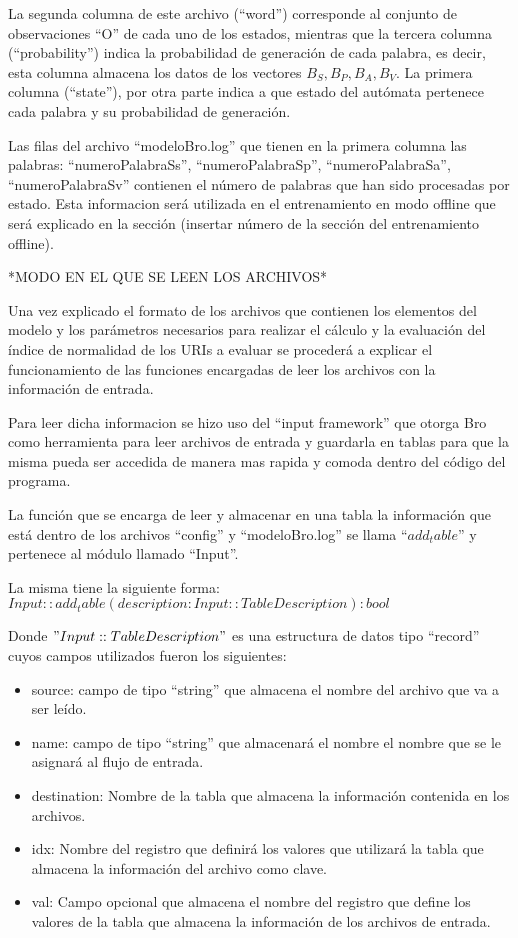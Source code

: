 La segunda columna de este archivo (“word”) corresponde al conjunto de observaciones “O” de cada uno de los estados, mientras que la tercera columna (“probability”) indica la probabilidad de generación de cada palabra, es decir, esta columna almacena los datos de los vectores $B_{S}, B_{P}, B_{A}, B_{V}$. La primera columna (“state”), por otra parte indica a que estado del autómata pertenece cada palabra y su probabilidad de generación.

Las filas del archivo “modeloBro.log” que tienen en la primera columna las palabras:       “numeroPalabraSs”, “numeroPalabraSp”, “numeroPalabraSa”, “numeroPalabraSv” contienen el número de palabras que han sido procesadas por estado. Esta informacion será utilizada en el entrenamiento en modo offline que será explicado en la sección (insertar número de la sección del entrenamiento offline).

*MODO EN EL QUE SE LEEN LOS ARCHIVOS*

Una vez explicado el formato de los archivos que contienen los elementos del modelo y los parámetros necesarios para realizar el cálculo y la evaluación del índice de normalidad de los URIs a evaluar se procederá a explicar el funcionamiento de las funciones encargadas de leer los archivos con la información de entrada.

Para leer dicha informacion se hizo uso del  “input framework” que otorga Bro como herramienta para leer archivos de entrada y guardarla en tablas para que la misma pueda ser accedida de manera mas rapida y comoda dentro del código del programa. 

La función que se encarga de leer y almacenar en una tabla la información que está dentro de los archivos “config” y “modeloBro.log”  se llama $“add_table”$ y pertenece al módulo llamado “Input”.


%
La misma tiene la siguiente forma: $Input::add_table(description: Input::TableDescription) : bool$ 

Donde $"Input::TableDescription"$ es una estructura de datos tipo “record” cuyos campos utilizados fueron los siguientes:

\begin{itemize}
\item source: campo de tipo “string” que almacena el nombre del archivo que va a ser leído.
\item name: campo de tipo “string” que almacenará el nombre el nombre que se le asignará al flujo de entrada.
\item destination: Nombre de la tabla que almacena la información contenida en los archivos.
\item idx: Nombre del registro que definirá los valores que utilizará la tabla que almacena la información del archivo como clave.
\item val: Campo opcional que almacena el nombre del registro que define los valores de la tabla que almacena la información de los archivos de entrada.
\end{itemize}

